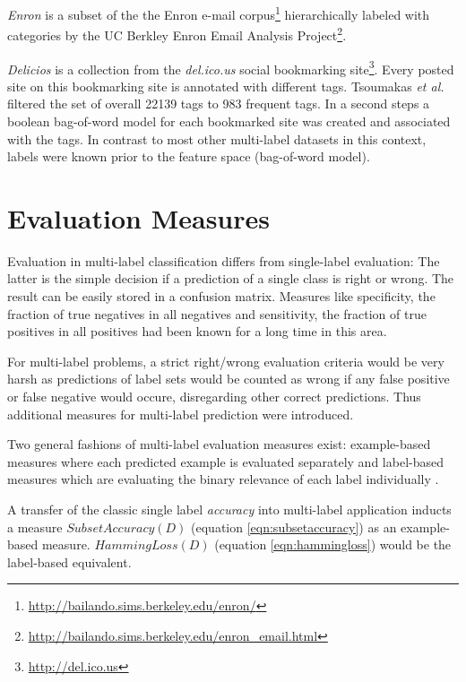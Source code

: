 		\textit{Enron} \cite{read:2008} is a subset of the the Enron e-mail corpus\footnote{\url{http://bailando.sims.berkeley.edu/enron/}} hierarchically labeled with categories by the UC Berkley Enron Email Analysis Project\footnote{\url{http://bailando.sims.berkeley.edu/enron_email.html}}.

		\textit{Delicios} \cite{Tsoumakas08} is a collection from the \textit{del.ico.us} social bookmarking site\footnote{\url{http://del.ico.us}}. Every posted site on this bookmarking site is annotated with different tags. Tsoumakas \textit{et al.} filtered the set of overall 22139 tags to 983 frequent tags. In a second steps a boolean bag-of-word model for each bookmarked site was created and associated with the tags. In contrast to most other multi-label datasets in this context, labels were known prior to the feature space (bag-of-word model).

	\section{Evaluation Measures}
	\label{sec:evalmeasures}
	
		Evaluation in multi-label classification differs from single-label evaluation: The latter is the simple decision if a prediction of a single class is right or wrong. The result can be easily stored in a confusion matrix. Measures like specificity, the fraction of true negatives in all negatives and sensitivity, the fraction of true positives in all positives had been known for a long time in this area.

		For multi-label problems, a strict right/wrong evaluation criteria would be very harsh as predictions of label sets would be counted as wrong if any false positive or false negative would occure, disregarding other correct predictions. Thus additional measures for multi-label prediction were introduced.

		Two general fashions of multi-label evaluation measures exist: example-based measures where each predicted example is evaluated separately and label-based measures which are evaluating the binary relevance of each label individually \cite{citeulike:8938538}.

		A transfer of the classic single label \textit{accuracy} into multi-label application inducts a measure $SubsetAccuracy(D)$ (equation \ref{eqn:subsetaccuracy}) \cite{Ghamrawi05collectivemultilabel} as an example-based measure. $HammingLoss(D)$ (equation \ref{eqn:hammingloss}) \cite{Schapire00boostexter:a} would be the label-based equivalent.
	
